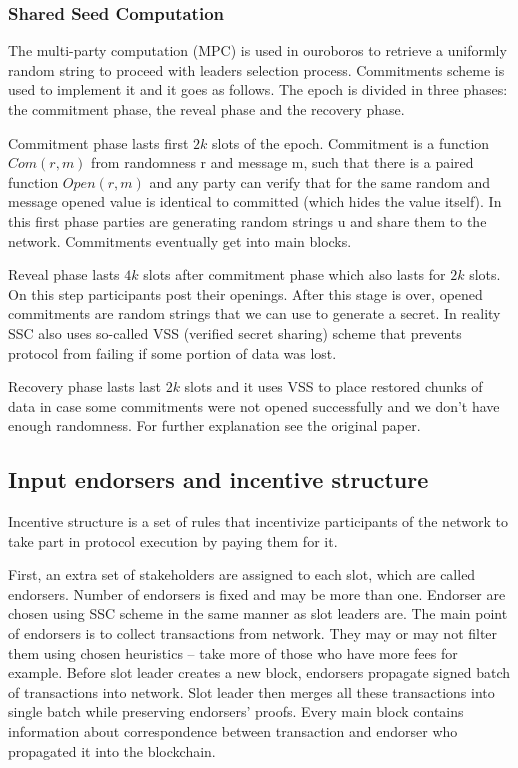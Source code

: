\documentclass[]{itmo-student-thesis}
\begin{document}
\subsubsection{Shared Seed Computation}

The multi-party computation (MPC) is used in ouroboros to retrieve a
uniformly random string to proceed with leaders selection
process. Commitments scheme is used to implement it and it goes as
follows. The epoch is divided in three phases: the commitment phase,
the reveal phase and the recovery phase.

Commitment phase lasts first $2k$ slots of the epoch. Commitment is a
function $Com(r,m)$ from randomness r and message m, such that there
is a paired function $Open(r,m)$ and any party can verify that for the
same random and message opened value is identical to committed (which
hides the value itself). In this first phase parties are generating
random strings u and share them to the network. Commitments eventually
get into main blocks.

Reveal phase lasts $4k$ slots after commitment phase which also lasts
for $2k$ slots. On this step participants post their openings. After
this stage is over, opened commitments are random strings that we can
use to generate a secret. In reality SSC also uses so-called VSS
(verified secret sharing) scheme that prevents protocol from failing
if some portion of data was lost.

Recovery phase lasts last $2k$ slots and it uses VSS to place restored
chunks of data in case some commitments were not opened successfully
and we don’t have enough randomness. For further explanation see the
original paper.

\subsection{Input endorsers and incentive structure}

Incentive structure is a set of rules that incentivize participants of
the network to take part in protocol execution by paying them for it.

First, an extra set of stakeholders are assigned to each slot, which
are called endorsers. Number of endorsers is fixed and may be more
than one. Endorser are chosen using SSC scheme in the same manner as
slot leaders are. The main point of endorsers is to collect
transactions from network. They may or may not filter them using
chosen heuristics -- take more of those who have more fees for
example. Before slot leader creates a new block, endorsers propagate
signed batch of transactions into network. Slot leader then merges all
these transactions into single batch while preserving endorsers’
proofs. Every main block contains information about correspondence
between transaction and endorser who propagated it into the
blockchain.
\end{document}
